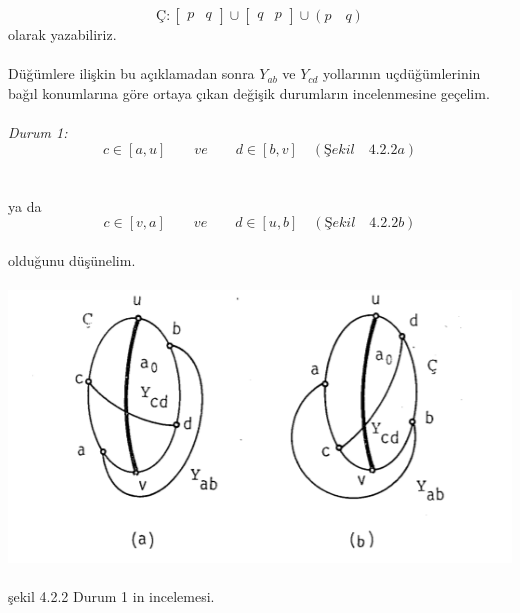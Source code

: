 \documentclass{article}
\begin{document}
\begin{equation*}
Ç : \begin{bmatrix}
 p & q 
\end{bmatrix} \cup 
\begin{bmatrix}
q & p 
\end{bmatrix}\cup  (p \quad q)
\end{equation*}
olarak yazabiliriz.
\\ \\
Düğümlere ilişkin bu açıklamadan sonra $Y_{ab}$ ve $Y_{cd}$ yollarının uçdüğümlerinin bağıl konumlarına göre ortaya çıkan değişik durumların incelenmesine
geçelim.
\\ \\ 
\textit{Durum 1:}
\begin{equation*}
c \in  [a,u]
\quad \quad 
ve \quad \quad d \in  [b,v] \quad
(Şekil \quad4.2.2a)
\end{equation*}
\\ \\ 
ya da 
\begin{equation*}
c \in  [v,a]
\quad \quad 
ve \quad \quad d \in  [u,b] \quad
(Şekil\quad 4.2.2b)
\end{equation*}
\\
olduğunu düşünelim.
\\ \\
\includegraphics{sekil}\\\\

şekil 4.2.2 Durum 1 in incelemesi.
\end{document}
